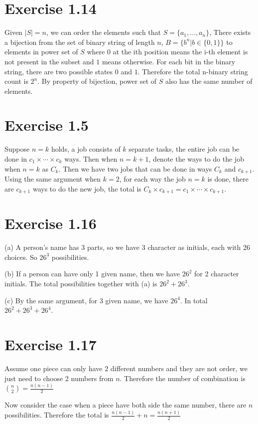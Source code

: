 \documentclass[12pt]{article}
\begin{document}
\section*{Exercise 1.14}
Given $|S| = n$, we can order the elements such that $S=\{a_1,\ldots, a_n\}$, There exists a bijection from the set of binary string of length $n$, $B = \{b^n|b\in \{0,1\}\}$ to elements in power set of $S$ where $0$ at the ith position means the i-th element is not present in the subset and $1$ means otherwise.  For each bit in the binary string, there are two possible states $0$ and $1$. Therefore the total n-binary string count is $2^n$. By property of bijection, power set of $S$ also has the same number of elements.

\section*{Exercise 1.5}
Suppose $n=k$ holds, a job consists of $k$ separate tasks, the entire job can be done in $c_1 \times \cdots \times c_k$ ways. Then when $n=k+1$, denote the ways to do the job when $n=k$ as $C_k$. Then we have two jobs that can be done in ways $C_k$ and $c_{k+1}$. Using the same argument when $k=2$, for each way the job $n=k$ is done, there are $c_{k+1}$ ways to do the new job, the total is $C_k \times c_{k+1} = c_1 \times \cdots \times c_{k+1}$. \QED

\section*{Exercise 1.16}
(a) A person's name has 3 parts, so we have 3 character as initials, each with 26 choices. So $26^3$ possibilities.

(b) If a person can have only 1 given name, then we have $26^2$ for 2 character initials. The total possibilities together with (a) is $26^2 + 26^3$.

(c) By the same argument, for 3 given name, we have $26^4$. In total $26^2+26^3+26^4$.

\section*{Exercise 1.17}
Assume one piece can only have 2 different numbers and they are not order, we just need to choose 2 numbers from $n$. Therefore the number of combination is ${n \choose 2} = \frac{n(n-1)}{2}$

Now consider the case when a piece have both side the same number, there are $n$ possibilities.
Therefore the total is $\frac{n(n-1)}{2} + n  = \frac{n(n+1)}{2}$
\end{document}
